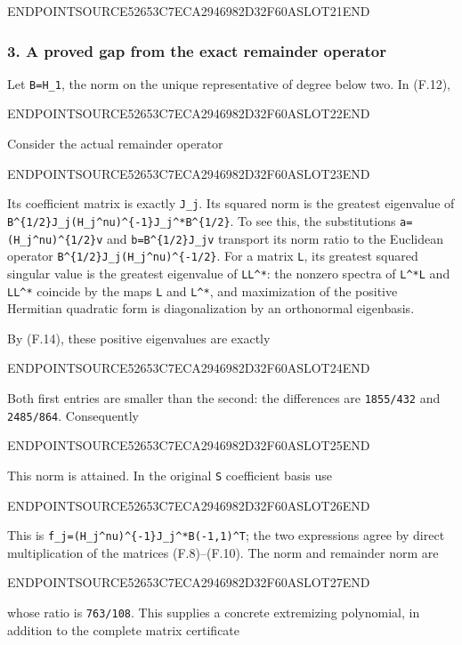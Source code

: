 ENDPOINTSOURCE52653C7ECA2946982D32F60ASLOT21END

\subsubsection{3. A proved gap from the exact remainder operator}\label{endpoint-restriction_fixture--a-proved-gap-from-the-exact-remainder-operator}

Let \texttt{B=H\_1}, the norm on the unique representative of degree below two. In (F.12),

ENDPOINTSOURCE52653C7ECA2946982D32F60ASLOT22END

Consider the actual remainder operator

ENDPOINTSOURCE52653C7ECA2946982D32F60ASLOT23END

Its coefficient matrix is exactly \texttt{J\_j}. Its squared norm is the greatest eigenvalue of \texttt{B\^{}\{1/2\}J\_j(H\_j\^{}nu)\^{}\{-1\}J\_j\^{}*B\^{}\{1/2\}}. To see this, the substitutions \texttt{a=(H\_j\^{}nu)\^{}\{1/2\}v} and \texttt{b=B\^{}\{1/2\}J\_jv} transport its norm ratio to the Euclidean operator \texttt{B\^{}\{1/2\}J\_j(H\_j\^{}nu)\^{}\{-1/2\}}. For a matrix \texttt{L}, its greatest squared singular value is the greatest eigenvalue of \texttt{LL\^{}*}: the nonzero spectra of \texttt{L\^{}*L} and \texttt{LL\^{}*} coincide by the maps \texttt{L} and \texttt{L\^{}*}, and maximization of the positive Hermitian quadratic form is diagonalization by an orthonormal eigenbasis.

By (F.14), these positive eigenvalues are exactly

ENDPOINTSOURCE52653C7ECA2946982D32F60ASLOT24END

Both first entries are smaller than the second: the differences are \texttt{1855/432} and \texttt{2485/864}. Consequently

ENDPOINTSOURCE52653C7ECA2946982D32F60ASLOT25END

This norm is attained. In the original \texttt{S} coefficient basis use

ENDPOINTSOURCE52653C7ECA2946982D32F60ASLOT26END

This is \texttt{f\_j=(H\_j\^{}nu)\^{}\{-1\}J\_j\^{}*B(-1,1)\^{}T}; the two expressions agree by direct multiplication of the matrices (F.8)--(F.10). The norm and remainder norm are

ENDPOINTSOURCE52653C7ECA2946982D32F60ASLOT27END

whose ratio is \texttt{763/108}. This supplies a concrete extremizing polynomial, in addition to the complete matrix certificate

